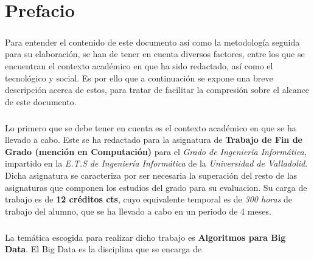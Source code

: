 \documentclass{subfiles}
\begin{document}
  \chapter*{Prefacio}

    \paragraph{}
    Para entender el contenido de este documento así como la metodología seguida para su elaboración, se han de tener en cuenta diversos factores, entre los que se encuentran el contexto académico en que ha sido redactado, así como el tecnológico y social. Es por ello que a continuación se expone una breve descripción acerca de estos, para tratar de facilitar la compresión sobre el alcance de este documento.

    \paragraph{}
    Lo primero que se debe tener en cuenta es el contexto académico en que se ha llevado a cabo. Este se ha redactado para la asignatura de \textbf{Trabajo de Fin de Grado (mención en Computación)} para el \emph{Grado de Ingeniería Informática}, impartido en la \emph{E.T.S de Ingeniería Informática} de la \emph{Universidad de Valladolid}. Dicha asignatura se caracteriza por ser necesaria la superación del resto de las asignaturas que componen los estudios del grado para su evaluacion. Su carga de trabajo es de \textbf{12 créditos cts}, cuyo equivalente temporal es de \emph{300 horas} de trabajo del alumno, que se ha llevado a cabo en un periodo de 4 meses.

    \paragraph{}
    La temática escogida para realizar dicho trabajo es \textbf{Algoritmos para Big Data}. El Big Data es la disciplina que se encarga de \cite{wiki:big_data}
\end{document}
